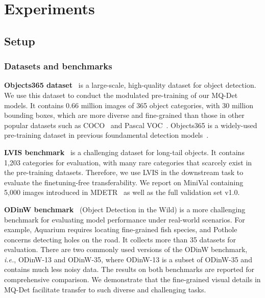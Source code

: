 \section{Experiments}












\subsection{Setup}

\subsubsection{Datasets and benchmarks}
\textbf{Objects365 dataset}~\cite{objects365}
is a large-scale, high-quality dataset for object detection. We use this dataset to conduct the modulated pre-training of our MQ-Det models.
It contains 0.66 million images of 365 object categories, with 30 million bounding boxes, which are more diverse and fine-grained than those in other popular datasets such as COCO~\cite{coco} and Pascal VOC~\cite{everingham2010pascal}. Objects365 is a widely-used pre-training dataset in previous foundamental detection models~\cite{glip,glipv2,groundingdino,omdet,florence,yao2023detclipv2}.


\textbf{LVIS benchmark}~\cite{lvis}
is a challenging dataset for long-tail objects. It contains 1,203 categories for evaluation, with many rare categories that scarcely exist in the pre-training datasets. Therefore, 
we use LVIS in the downstream task to evaluate the finetuning-free transferability. We report on MiniVal containing 5,000 images introduced in MDETR~\cite{mdetr} as well as the full validation set v1.0. 



\textbf{ODinW benchmark}~\cite{elevater} (Object Detection in the Wild) is a more challenging benchmark for evaluating model performance under real-world scenarios. For example, Aquarium requires locating fine-grained fish species, and Pothole concerns detecting holes on the road. It collects more than 35 datasets for evaluation.
There are two commonly used versions of the ODinW benchmark, \emph{i.e.}, ODinW-13 and ODinW-35, where ODinW-13 is a subset of ODinW-35 and contains much less noisy data.  The results on both benchmarks are reported for comprehensive comparison. We demonstrate that the fine-grained visual details in MQ-Det facilitate transfer to such diverse and challenging tasks.


